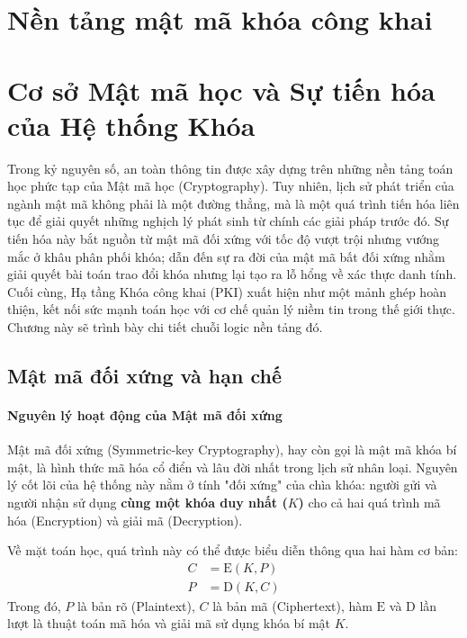\chapter{Nền tảng mật mã khóa công khai}
\chapter{Cơ sở Mật mã học và Sự tiến hóa của Hệ thống Khóa}
\label{chap:crypto}

Trong kỷ nguyên số, an toàn thông tin được xây dựng trên những nền tảng toán học phức tạp của Mật mã học (Cryptography). Tuy nhiên, lịch sử phát triển của ngành mật mã không phải là một đường thẳng, mà là một quá trình tiến hóa liên tục để giải quyết những nghịch lý phát sinh từ chính các giải pháp trước đó. Sự tiến hóa này bắt nguồn từ mật mã đối xứng với tốc độ vượt trội nhưng vướng mắc ở khâu phân phối khóa; dẫn đến sự ra đời của mật mã bất đối xứng nhằm giải quyết bài toán trao đổi khóa nhưng lại tạo ra lỗ hổng về xác thực danh tính. Cuối cùng, Hạ tầng Khóa công khai (PKI) xuất hiện như một mảnh ghép hoàn thiện, kết nối sức mạnh toán học với cơ chế quản lý niềm tin trong thế giới thực. Chương này sẽ trình bày chi tiết chuỗi logic nền tảng đó.

\section{Mật mã đối xứng và hạn chế}
\label{sec:2.1}

\subsubsection*{Nguyên lý hoạt động của Mật mã đối xứng}

Mật mã đối xứng (Symmetric-key Cryptography), hay còn gọi là mật mã khóa bí mật, là hình thức mã hóa cổ điển và lâu đời nhất trong lịch sử nhân loại. Nguyên lý cốt lõi của hệ thống này nằm ở tính "đối xứng" của chìa khóa: người gửi và người nhận sử dụng \textbf{cùng một khóa duy nhất ($K$)} cho cả hai quá trình mã hóa (Encryption) và giải mã (Decryption).

Về mặt toán học, quá trình này có thể được biểu diễn thông qua hai hàm cơ bản:
\begin{align*}
    C &= \mathrm{E}(K, P) \\
    P &= \mathrm{D}(K, C)
\end{align*}
Trong đó, $P$ là bản rõ (Plaintext), $C$ là bản mã (Ciphertext), hàm $\mathrm{E}$ và $\mathrm{D}$ lần lượt là thuật toán mã hóa và giải mã sử dụng khóa bí mật $K$.


